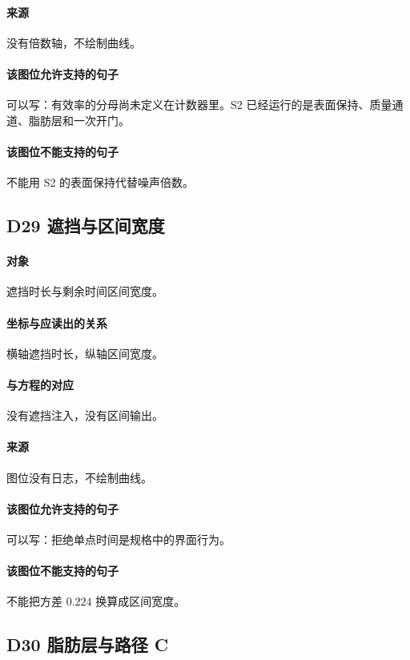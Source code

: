 \paragraph{来源}
没有倍数轴，不绘制曲线。

\paragraph{该图位允许支持的句子}
可以写：有效率的分母尚未定义在计数器里。S2 已经运行的是表面保持、质量通道、脂肪层和一次开门。

\paragraph{该图位不能支持的句子}
不能用 S2 的表面保持代替噪声倍数。

\subsection{D29 遮挡与区间宽度}
\paragraph{对象}
遮挡时长与剩余时间区间宽度。

\paragraph{坐标与应读出的关系}
横轴遮挡时长，纵轴区间宽度。

\paragraph{与方程的对应}
没有遮挡注入，没有区间输出。

\paragraph{来源}
图位没有日志，不绘制曲线。

\paragraph{该图位允许支持的句子}
可以写：拒绝单点时间是规格中的界面行为。

\paragraph{该图位不能支持的句子}
不能把方差 $0.224$ 换算成区间宽度。

\subsection{D30 脂肪层与路径 C}
